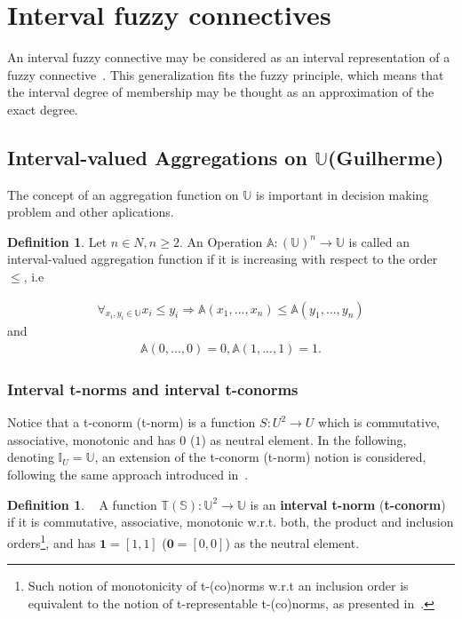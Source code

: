 \documentclass[12pt]{article}
\theoremstyle{plain}
\theoremstyle{remark}
\theoremstyle{definition}
\newtheorem{definition}[theorem]{Definition}
\theoremstyle{proposition}
\newcommand{\II}{\mathbb{I} }
\newcommand{\UU}{\mathbb{U} }
\begin{document}

\section{Interval fuzzy connectives}\label{sec-4}

 An interval fuzzy connective may be considered as an interval representation of a fuzzy connective~\cite{BT06b}. This generalization fits the fuzzy principle, which means that the interval degree of membership may be thought as an approximation of the exact degree.

\subsection{Interval-valued Aggregations on $\UU$(Guilherme)}

The concept of an aggregation function on $\UU$ is important in decision making problem and other aplications.


\begin{definition}\label{def-intAggregation}
Let  $n \in N, n \geq 2$. An Operation $\mathbb{A} : (\UU)^n \rightarrow \UU$ is called an interval-valued aggregation function if it is increasing with respect to the order $\leq$, i.e
\end{definition}
\begin{eqnarray}
\forall_{x_i,y_i \in \UU} x_i \leq y_i \Rightarrow \mathbb{A}(x_1,...,x_n) \leq \mathbb{A}(y_1,...,y_n)
\end{eqnarray}
and
\begin{eqnarray*}
\mathbb{A}(0,...,0) = 0, \mathbb{A}(1,...,1) = 1.
\end{eqnarray*}


\subsubsection{Interval t-norms and interval t-conorms}\label{subsec-3b} 
Notice that  a t-conorm (t-norm) is a function $S:U^2 \rightarrow U$ which is commutative,  associative, monotonic and has $0$ ($1$) as neutral element. In the following, denoting $\II_{U}=\mathbb{U}$, an extension of the t-conorm (t-norm) notion is considered, following the same approach introduced in~\cite{BT06b}.

\begin{definition}~\cite[Definition 5.1]{BT06b} \label{def-itnorm}
A function  $\mathbb{T}(\mathbb{S}):\UU^2 \rightarrow \UU$ is an \textbf{interval t-norm}  (\textbf{t-conorm}) if it is commutative, associative, monotonic w.r.t. both, the product and inclusion orders\footnote{Such notion of monotonicity of t-(co)norms w.r.t an inclusion order is equivalent to the notion of t-representable t-(co)norms, as presented in~\cite{Des08}.}, and has $\mathbf{1}=[1,1]$ ($\mathbf{0}=[0,0]$) as the neutral element.
\end{definition}
\end{document}
